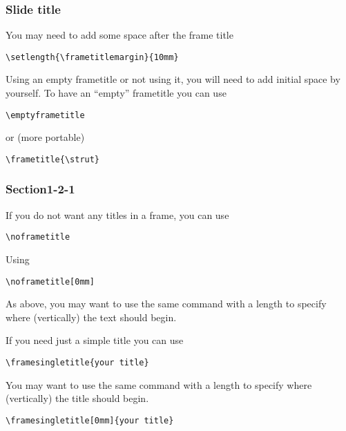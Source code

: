 \documentclass[t,compress,aspectratio=43,12p]{beamer} %
\begin{document}
\begin{frame}[fragile]
\frametitle{Slide title}
You may need to add some space after the frame title
\begin{lstlisting}
\setlength{\frametitlemargin}{10mm}
\end{lstlisting}

\pause  %
\vskip 3mm
Using an empty frametitle or not using it, you will need to add initial space by yourself.
To have an ``empty'' frametitle you can use
\begin{lstlisting}
\emptyframetitle
\end{lstlisting}

\pause
or (more portable)
\begin{lstlisting}
\frametitle{\strut}
\end{lstlisting}
\end{frame}

\subsubsection{Section1-2-1}
\begin{frame}[fragile]
\noframetitle
If you do not want any titles in a frame, you can use
\begin{lstlisting}
\noframetitle
\end{lstlisting}
\end{frame}

\begin{frame}[fragile]
\noframetitle[0mm]
Using 
\begin{lstlisting}
\noframetitle[0mm]
\end{lstlisting}

\vskip 5mm
As above, you may want to use the same command with a length to specify where (vertically) the text should begin.
\end{frame}

\begin{frame}[fragile]
If you need just a simple title you can use
\begin{lstlisting}
\framesingletitle{your title}
\end{lstlisting}

\vskip 5mm
You may want to use the same command with a length to specify where (vertically) the title should begin.
\begin{lstlisting}
\framesingletitle[0mm]{your title}
\end{lstlisting}
\end{frame}
\end{document}

